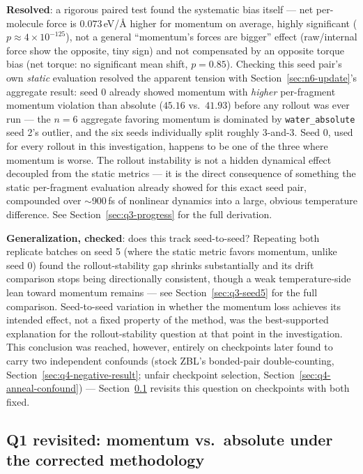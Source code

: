\documentclass[11pt]{article}
\begin{document}
\textbf{Resolved}: a rigorous paired test found the systematic bias itself
--- net per-molecule force is $0.073$\,eV/\AA{} higher for momentum on
average, highly significant ($p\approx4{\times}10^{-125}$), not a general
``momentum's forces are bigger'' effect (raw/internal force show the
opposite, tiny sign) and not compensated by an opposite torque bias (net
torque: no significant mean shift, $p=0.85$). Checking this seed pair's own
\emph{static} evaluation resolved the apparent tension with
Section~\ref{sec:n6-update}'s aggregate result: seed 0 already showed
momentum with \emph{higher} per-fragment momentum violation than absolute
($45.16$ vs.\ $41.93$) before any rollout was ever run --- the $n{=}6$
aggregate favoring momentum is dominated by \texttt{water\_absolute} seed
2's outlier, and the six seeds individually split roughly 3-and-3. Seed 0,
used for every rollout in this investigation, happens to be one of the three
where momentum is worse. The rollout instability is not a hidden dynamical
effect decoupled from the static metrics --- it is the direct consequence of
something the static per-fragment evaluation already showed for this exact
seed pair, compounded over $\sim$900\,fs of nonlinear dynamics into a large,
obvious temperature difference. See Section~\ref{sec:q3-progress} for the
full derivation.

\textbf{Generalization, checked}: does this track seed-to-seed? Repeating
both replicate batches on seed 5 (where the static metric favors momentum,
unlike seed 0) found the rollout-stability gap shrinks substantially and its
drift comparison stops being directionally consistent, though a weak
temperature-side lean toward momentum remains --- see
Section~\ref{sec:q3-seed5} for the full comparison. Seed-to-seed variation
in whether the momentum loss achieves its intended effect, not a fixed
property of the method, was the best-supported explanation for the
rollout-stability question at that point in the investigation. This
conclusion was reached, however, entirely on checkpoints later found to
carry two independent confounds (stock ZBL's bonded-pair double-counting,
Section~\ref{sec:q4-negative-result}; unfair checkpoint selection,
Section~\ref{sec:q4-anneal-confound}) --- Section~\ref{sec:q1-rollout-update}
revisits this question on checkpoints with both fixed.

\subsection{Q1 revisited: momentum vs.\ absolute under the corrected methodology}
\label{sec:q1-rollout-update}
\end{document}
